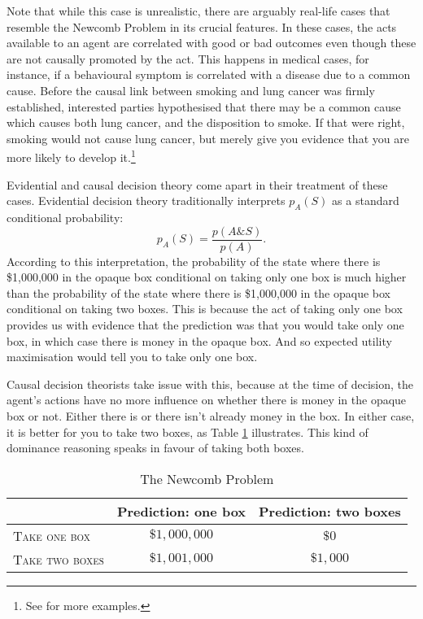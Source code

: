 Note that while this case is unrealistic, there are arguably real-life cases that resemble the Newcomb Problem in its crucial features. In these cases, the acts available to an agent are correlated with good or bad outcomes even though these are not causally promoted by the act. This happens in medical cases, for instance, if a behavioural symptom is correlated with a disease due to a common cause. Before the causal link between smoking and lung cancer was firmly established, interested parties hypothesised that there may be a common cause which causes both lung cancer, and the disposition to smoke. If that were right, smoking would not cause lung cancer, but merely give you evidence that you are more likely to develop it.\footnote{See \citet{Price1991} for more examples.}

Evidential and causal decision theory come apart in their treatment of these cases. Evidential decision theory traditionally interprets $p_{A} (S)$ as a standard conditional probability:
$$p_{A} (S) = \frac{p(A\&S)}{p(A)}.$$
According to this interpretation, the probability of the state where there is \$1,000,000 in the opaque box conditional on taking only one box is much higher than the probability of the state where there is \$1,000,000 in the opaque box conditional on taking two boxes. This is because the act of taking only one box provides us with evidence that the prediction was that you would take only one box, in which case there is money in the opaque box. And so expected utility maximisation would tell you to take only one box.

Causal decision theorists take issue with this, because at the time of decision, the agent's actions have no more influence on whether there is money in the opaque box or not. Either there is or there isn't already money in the box. In either case, it is better for you to take two boxes, as Table \ref{t4} illustrates. This kind of dominance reasoning speaks in favour of taking both boxes.

\begin{table}[h]
\centering
  \begin{tabular}{lcc}
  \hline
                           & Prediction: one box & Prediction: two boxes\\\hline\hline
  \textsc{Take one box}    & $\$1,000,000$ & $\$0$ \\
  \textsc{Take two boxes}  & $\$1,001,000$ & $\$1,000$\\
  \hline
  \end{tabular}
\caption{The Newcomb Problem}
\label{t4}
\end{table}

